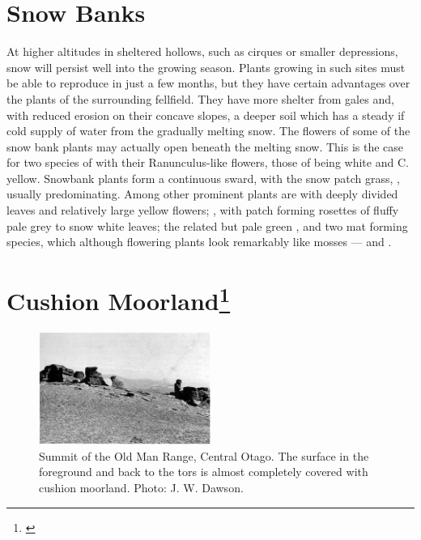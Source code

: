 \section{Snow Banks}

At higher altitudes in sheltered hollows, such as cirques or smaller depressions, snow will persist well into the growing season.
Plants growing in such sites must be able to reproduce in just a few months, but they have certain advantages over the plants of the surrounding fellfield.
They have more shelter from gales and, with reduced erosion on their concave slopes, a deeper soil which has a steady if cold supply of water from the gradually melting snow.
The flowers of some of the snow bank plants may actually open beneath the melting snow.
This is the case for two species of  with their Ranunculus-like flowers, those of   being white and C.  yellow.
Snowbank plants form a continuous sward, with the snow patch grass, , usually predominating.
Among other prominent plants are  with deeply divided leaves and relatively large yellow flowers; , with patch forming rosettes of fluffy pale grey to snow white leaves; the related but pale green , and two mat forming species, which although flowering plants look remarkably like mosses ---  and .

\section[Cushion Moorland]{Cushion Moorland\footnote{\cite{mark1970high}}}

\begin{figure}
	\includegraphics[width=0.5\textwidth]{graphics/figure113summit.jpg}
	\centering
	\caption[Summit of the Old Man Range]{Summit of the Old Man Range, Central Otago.
	The surface in the foreground and back to the tors is almost completely covered with cushion moorland.
	Photo: J. W. Dawson.}%
	\label{fig:113summit}
\end{figure}


